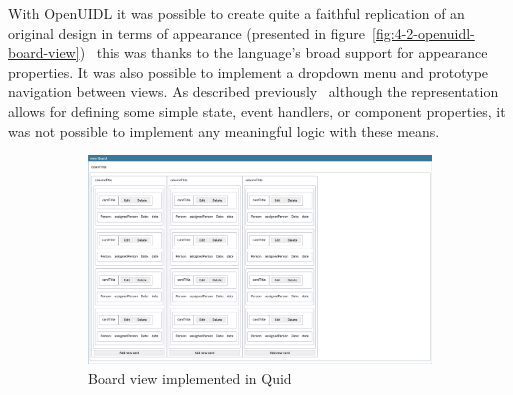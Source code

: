 With OpenUIDL it was possible to create quite a faithful replication of an original design in terms of appearance (presented in figure~\ref{fig:4-2-openuidl-board-view}) \textendash\ this was thanks to the language's broad support for appearance properties.
It was also possible to implement a dropdown menu and prototype navigation between views.
As described previously \textendash\ although the representation allows for defining some simple state, event handlers, or component properties, it was not possible to implement any meaningful logic with these means.

\begin{figure}
    \centering
    \begin{subfigure}[m]{0.5\textwidth}
        \centering
        \includegraphics[height=0.2\textheight]{./4-results-and-discussion/quid-board-view}
        \caption{Board view implemented in Quid}
        \label{fig:4-2-quid-board-view}
    \end{subfigure}
    \hfill
    \begin{subfigure}[m]{0.35\textwidth}
        \centering

\end{subfigure}
\end{figure}
